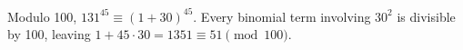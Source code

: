 Modulo 100, $131^{45}\equiv(1+30)^{45}$. Every binomial term involving $30^2$ is divisible by 100, leaving $1+45\cdot30=1351\equiv\boxed{51}\pmod{100}$.

